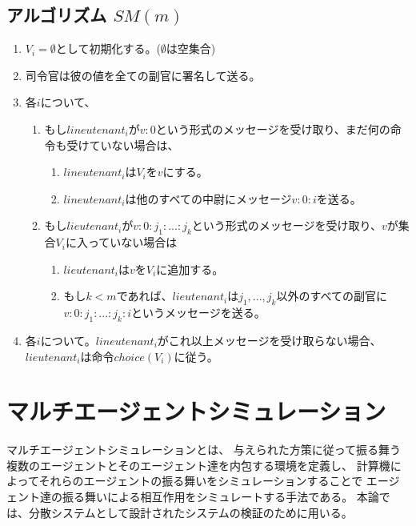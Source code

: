 \subsection{アルゴリズム $SM(m)$}
\begin{enumerate}
  \item $V_i=\emptyset$として初期化する。($\emptyset$は空集合)
  \item 司令官は彼の値を全ての副官に署名して送る。
  \item 各$i$について、 
  \begin{enumerate}
    \item もし$lineutenant_i$が$v:0$という形式のメッセージを受け取り、まだ何の命令も受けていない場合は、
    \begin{enumerate}
      \item $lineutenant_i$は$ V_i$を${v}$にする。 
      \item $lineutenant_i$は他のすべての中尉にメッセージ$v:0:i$を送る。
    \end{enumerate}
    \item もし$lieutenant_i$が$v:0:j_1:...:j_k$という形式のメッセージを受け取り、$v$が集合$V_i$に入っていない場合は
    \begin{enumerate}
      \item $lieutenant_i$は$v$を$V_i$に追加する。
      \item もし$k<m$であれば、$lieutenant_i$は$j_1, ..., j_k$以外のすべての副官に$v:0:j_1:...:j_k:i$というメッセージを送る。
    \end{enumerate}
  \end{enumerate}
  \item 各$i$について。$lineutenant_i$がこれ以上メッセージを受け取らない場合、$lieutenant_i$は命令$choice(V_i)$に従う。
\end{enumerate}

\section{マルチエージェントシミュレーション}
マルチエージェントシミュレーションとは、
与えられた方策に従って振る舞う複数のエージェントとそのエージェント達を内包する環境を定義し、
計算機によってそれらのエージェントの振る舞いをシミュレーションすることで
エージェント達の振る舞いによる相互作用をシミュレートする手法である。
本論では、分散システムとして設計されたシステムの検証のために用いる。
